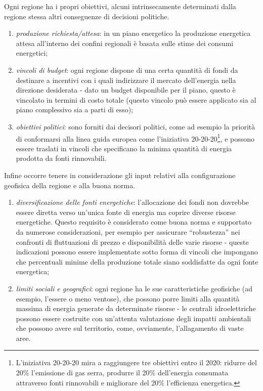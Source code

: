 Ogni regione ha i propri obiettivi, alcuni intrinsecamente determinati dalla regione stessa altri conseguenze di decisioni politiche.
\begin{enumerate}
\item \emph{produzione richiesta/attesa}: in un piano energetico la produzione energetica attesa all'interno  dei confini regionali è basata sulle stime dei consumi energetici;
\item \emph{vincoli di budget}: ogni regione dispone di una certa quantità di fondi da destinare a incentivi con i quali indirizzare il mercato dell'energia nella direzione desiderata - dato un budget disponibile per il piano, questo è vincolato in termini di costo totale (questo vincolo può essere applicato sia al piano complessivo sia a parti di esso);
\item \emph{obiettivi politici}: sono forniti dai decisori politici, come ad esempio la priorità di conformarsi alla linea guida europea come l'iniziativa 20-20-20\footnote{L'iniziativa 20-20-20 mira a raggiungere tre obiettivi entro il 2020: ridurre del 20\% l'emissione di gas serra, produrre il 20\% dell'energia consumata attraverso fonti rinnovabili e migliorare del 20\% l'efficienza energetica.}, e possono essere traslati in vincoli che specificano la minima quantità di energia prodotta da fonti rinnovabili.
\end{enumerate} 

Infine occorre tenere in considerazione gli input relativi alla configurazione geofisica della regione e alla buona norma.
\begin{enumerate}
\item \emph{diversificazione delle fonti energetiche}: l'allocazione dei fondi non dovrebbe essere diretta verso un'unica fonte di energia ma coprire diverse risorse energetiche. Questo requisito è considerato come buona norma e supportato da numerose considerazioni, per esempio per assicurare ``robustezza'' nei confronti di fluttuazioni di prezzo e disponibilità delle varie risorse - queste indicazioni possono essere implementate sotto forma di vincoli che impongano che percentuali minime della produzione totale siano soddisfatte da ogni fonte energetica;
\item \emph{limiti sociali e geografici}: ogni regione ha le sue caratteristiche geofisiche (ad esempio, l'essere o meno ventose), che possono porre limiti alla quantità massima di energia generate da determinate risorse - le centrali idroelettriche possono essere costruite con un'attenta valutazione degli impatti ambientali che possono avere sul territorio, come, ovviamente, l'allagamento di vaste aree.
\end{enumerate} 

